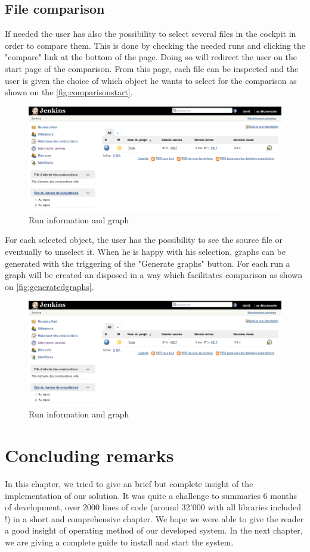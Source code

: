 \subsection{File comparison}
If needed the user has also the possibility to select several files in the cockpit in order to compare them. This is done by checking the needed runs and clicking the "compare" link at the bottom of the page. Doing so will redirect the user on the start page of the comparison. From this page, each file can be inspected and the user is given the choice of which object he wants to select for the comparison as shown on the \autoref{fig:comparisonstart}.
\begin{figure}[h!]
  \centering
    \includegraphics[width=\textwidth]{figures/jenkins.png}
    \caption{Run information and graph}
    \label{fig:comparisonstart}
\end{figure}

For each selected object, the user has the possibility to see the source file or eventually to unselect it. When he is happy with his selection, graphs can be generated with the triggering of the "Generate graphs" button. For each run a graph will be created an disposed in a way which facilitates comparison as shown on \autoref{fig:generatedgraphs}.
\begin{figure}[h!]
  \centering
    \includegraphics[width=\textwidth]{figures/jenkins.png}
    \caption{Run information and graph}
    \label{fig:generatedgraphs}
\end{figure}
\pagebreak

\section{Concluding remarks}
In this chapter, we tried to give an brief but complete insight of the implementation of our solution. It was quite a challenge to summaries 6 months of development, over 2000 lines of code (around 32'000 with all libraries included !) in a short and comprehensive chapter. We hope we were able to give the reader a good insight of operating method of our developed system. In the next chapter, we are giving a complete guide to install and start the system.
